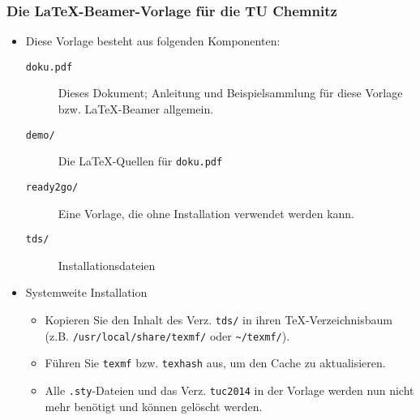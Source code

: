 \begin{frame}
\frametitle{Die \LaTeX-Beamer-Vorlage für die TU Chemnitz}

\begin{itemize}
\item Diese Vorlage besteht aus folgenden Komponenten:
  \begin{description}
  \item[\texttt{doku.pdf}]  Dieses Dokument; Anleitung und Beispielsammlung für
                            diese Vorlage bzw. \LaTeX-Beamer allgemein.
  \item[\texttt{demo/}]     Die \LaTeX-Quellen für \texttt{doku.pdf}
  \item[\texttt{ready2go/}] Eine Vorlage, die ohne Installation verwendet werden kann.
  \item[\texttt{tds/}]      Installationsdateien
  \end{description}

\bigskip

\item Systemweite Installation
  \begin{itemize}
  \item Kopieren Sie den Inhalt des Verz. \texttt{tds/} in ihren
        \TeX-Verzeichnisbaum (z.B. \texttt{/usr/local/share/texmf/} oder
        \texttt{\textasciitilde/texmf/}).
  \item Führen Sie \texttt{texmf} bzw. \texttt{texhash} aus, um den Cache zu
        aktualisieren.
  \item Alle \texttt{.sty}-Dateien und das Verz. \texttt{tuc2014} in der
        Vorlage werden nun nicht mehr benötigt und können gelöscht werden.
  \end{itemize}
\end{itemize}
\end{frame}
